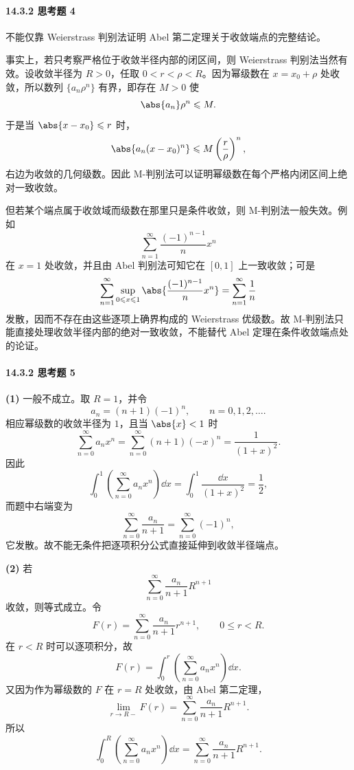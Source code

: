 \paragraph{14.3.2 思考题 4}
\begin{xsolution}
不能仅靠 Weierstrass 判别法证明 Abel 第二定理关于收敛端点的完整结论。

事实上，若只考察严格位于收敛半径内部的闭区间，则 Weierstrass 判别法当然有效。设收敛半径为 $R>0$，任取 $0<r<\rho<R$。因为幂级数在 $x=x_0+\rho$ 处收敛，所以数列 $\{a_n\rho^n\}$ 有界，即存在 $M>0$ 使
\[
  \abs{a_n}\rho^n\leqslant M.
\]
于是当 $\abs{x-x_0}\leqslant r$ 时，
\[
  \abs{a_n(x-x_0)^n}
  \leqslant M\left(\frac r\rho\right)^n,
\]
右边为收敛的几何级数。因此 M-判别法可以证明幂级数在每个严格内闭区间上绝对一致收敛。

但若某个端点属于收敛域而级数在那里只是条件收敛，则 M-判别法一般失效。例如
\[
  \sum_{n=1}^{\infty}\frac{(-1)^{n-1}}n x^n
\]
在 $x=1$ 处收敛，并且由 Abel 判别法可知它在 $[0,1]$ 上一致收敛；可是
\[
  \sum_{n=1}^{\infty}\sup_{0\leqslant x\leqslant1}
  \abs{\frac{(-1)^{n-1}}n x^n}
  =\sum_{n=1}^{\infty}\frac1n
\]
发散，因而不存在由这些逐项上确界构成的 Weierstrass 优级数。故 M-判别法只能直接处理收敛半径内部的绝对一致收敛，不能替代 Abel 定理在条件收敛端点处的论证。
\end{xsolution}

\paragraph{14.3.2 思考题 5}
\begin{xsolution}
\textbf{(1)} 一般不成立。取 $R=1$，并令
\[
  a_n=(n+1)(-1)^n,\qquad n=0,1,2,\ldots.
\]
相应幂级数的收敛半径为 $1$，且当 $\abs{x}<1$ 时
\[
  \sum_{n=0}^{\infty}a_nx^n
  =\sum_{n=0}^{\infty}(n+1)(-x)^n
  =\frac1{(1+x)^2}.
\]
因此
\[
  \int_0^1\left(\sum_{n=0}^{\infty}a_nx^n\right)\dd x
  =\int_0^1\frac{\dd x}{(1+x)^2}
  =\frac12,
\]
而题中右端变为
\[
  \sum_{n=0}^{\infty}\frac{a_n}{n+1}
  =\sum_{n=0}^{\infty}(-1)^n,
\]
它发散。故不能无条件把逐项积分公式直接延伸到收敛半径端点。

\textbf{(2)} 若
\[
  \sum_{n=0}^{\infty}\frac{a_n}{n+1}R^{n+1}
\]
收敛，则等式成立。令
\[
  F(r)=\sum_{n=0}^{\infty}\frac{a_n}{n+1}r^{n+1},
  \qquad 0\leqslant r<R.
\]
在 $r<R$ 时可以逐项积分，故
\[
  F(r)=\int_0^r\left(\sum_{n=0}^{\infty}a_nx^n\right)\dd x.
\]
又因为作为幂级数的 $F$ 在 $r=R$ 处收敛，由 Abel 第二定理，
\[
  \lim_{r\to R-}F(r)
  =\sum_{n=0}^{\infty}\frac{a_n}{n+1}R^{n+1}.
\]
所以
\[
  \int_0^R\left(\sum_{n=0}^{\infty}a_nx^n\right)\dd x
  =\sum_{n=0}^{\infty}\frac{a_n}{n+1}R^{n+1}.
\]
\end{xsolution}

